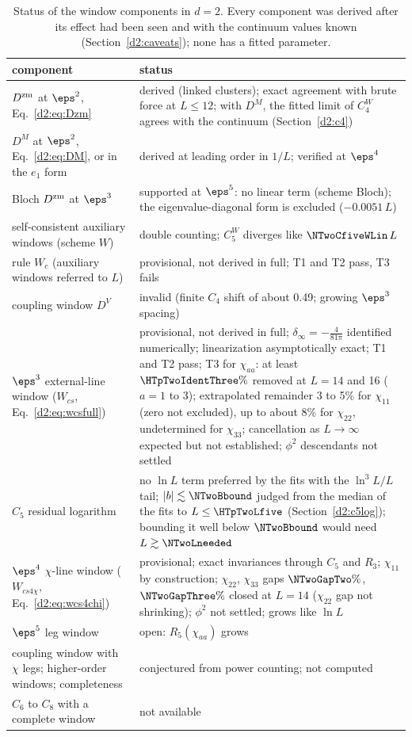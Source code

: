 \begin{table}[ht]
\centering\footnotesize\renewcommand{\arraystretch}{1.15}
\begin{tabular}{@{}p{6.4cm}p{8.6cm}@{}}
\toprule
component & status \\\midrule
$D^{\rm zm}$ at $\eps^2$, Eq.~\eqref{d2:eq:Dzm} & derived (linked clusters); exact agreement with brute force at $L\le12$; with $D^M$, the fitted limit of $C_4^W$ agrees with the continuum (Section~\ref{d2:c4}) \\
$D^M$ at $\eps^2$, Eq.~\eqref{d2:eq:DM}, or in the $e_1$ form & derived at leading order in $1/L$; verified at $\eps^4$ \\
Bloch $D^{\rm zm}$ at $\eps^3$ & supported at $\eps^5$: no linear term (scheme Bloch); the eigenvalue-diagonal form is excluded ($-0.0051\,L$) \\
self-consistent auxiliary windows (scheme $W$) & double counting; $C_5^W$ diverges like $\NTwoCfiveWLin\,L$ \\
rule $W_c$ (auxiliary windows referred to $L$) & provisional, not derived in full; T1 and T2 pass, T3 fails \\
coupling window $D^V$ & invalid (finite $C_4$ shift of about 0.49; growing $\eps^3$ spacing) \\
$\eps^3$ external-line window ($W_{cs}$, Eq.~\eqref{d2:eq:wcsfull}) & provisional, not derived in full; $\delta_\infty=-\frac4{81\pi}$ identified numerically; linearization asymptotically exact; T1 and T2 pass; T3 for $\chi_{aa}$: at least $\HTpTwoIdentThree\%$ removed at $L=14$ and 16 ($a=1$ to 3); extrapolated remainder 3 to 5\% for $\chi_{11}$ (zero not excluded), up to about 8\% for $\chi_{22}$, undetermined for $\chi_{33}$; cancellation as $L\to\infty$ expected but not established; $\phi^2$ descendants not settled \\
$C_5$ residual logarithm & no $\ln L$ term preferred by the fits with the $\ln^3L/L$ tail; $|b|\lesssim\NTwoBbound$ judged from the median of the fits to $L\le\HTpTwoLfive$ (Section~\ref{d2:c5log}); bounding it well below $\NTwoBbound$ would need $L\gtrsim\NTwoLneeded$ \\
$\eps^4$ $\chi$-line window ($W_{cs4\chi}$, Eq.~\eqref{d2:eq:wcs4chi}) & provisional; exact invariances through $C_5$ and $R_3$; $\chi_{11}$ by construction; $\chi_{22}$, $\chi_{33}$ gaps $\NTwoGapTwo\%$, $\NTwoGapThree\%$ closed at $L=14$ ($\chi_{22}$ gap not shrinking); $\phi^2$ not settled; grows like $\ln L$ \\
$\eps^5$ leg window & open: $R_5(\chi_{aa})$ grows \\
coupling window with $\chi$ legs; higher-order windows; completeness & conjectured from power counting; not computed \\
$C_6$ to $C_8$ with a complete window & not available \\
\bottomrule
\end{tabular}
\caption{Status of the window components in $d=2$. Every component was derived after its effect had been seen and with the
continuum values known (Section~\ref{d2:caveats}); none has a fitted parameter.}
\label{d2:tab:status}
\end{table}

